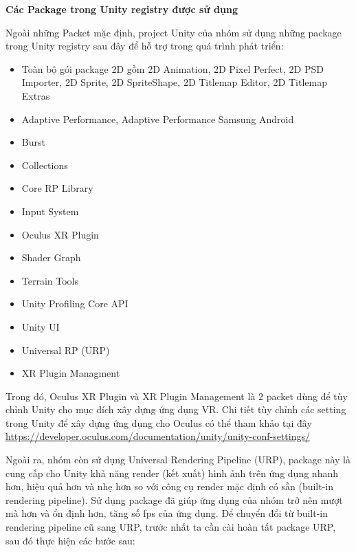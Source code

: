 \textbf{Các Package trong Unity registry được sử dụng} 

Ngoài những Packet mặc định, project Unity của nhóm sử dụng những package trong Unity registry sau đây để hỗ trợ trong quá trình phát triển:

\begin{itemize}
    \item Toàn bộ gói package 2D gồm 2D Animation, 2D Pixel Perfect, 2D PSD Importer, 2D Sprite, 2D SpriteShape, 2D Titlemap Editor, 2D Titlemap Extras
    \item Adaptive Performance, Adaptive Performance Samsung Android
    \item Burst
    \item Collections
    \item Core RP Library
    \item Input System
    \item Oculus XR Plugin
    \item Shader Graph
    \item Terrain Tools
    \item Unity Profiling Core API
    \item Unity UI
    \item Universal RP (URP)
    \item XR Plugin Managment
\end{itemize}

Trong đó, Oculus XR Plugin và XR Plugin Management là 2 packet dùng để tùy chỉnh Unity cho mục đích xây dựng ứng dụng VR. Chi tiết tùy chỉnh các setting trong Unity để xây dựng ứng dụng cho Oculus có thể tham khảo tại đây \href{https://developer.oculus.com/documentation/unity/unity-conf-settings/}{https://developer.oculus.com/documentation/unity/unity-conf-settings/}

Ngoài ra, nhóm còn sử dụng Universal Rendering Pipeline (URP), package này là cung cấp cho Unity khả năng render (kết xuất) hình ảnh trên ứng dụng nhanh hơn, hiệu quả hơn và nhẹ hơn so với công cụ render mặc định có sẵn (built-in rendering pipeline). Sử dụng package đã giúp ứng dụng của nhóm trở nên mượt mà hơn và ổn định hơn, tăng số fps của ứng dụng. Để chuyển đổi từ built-in rendering pipeline cũ sang URP, trước nhất ta cần cài hoàn tất package URP, sau đó thực hiện các bước sau:

